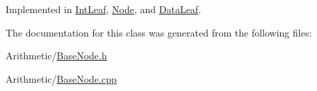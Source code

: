 Implemented in \hyperlink{class_int_leaf_a1817ac7916ab1c4ff09717db0a6d95f2}{Int\-Leaf}, \hyperlink{class_node_a858d4b4757880eba1fdead1412418693}{Node}, and \hyperlink{class_data_leaf_a62ce63296d298d6ffdc133dafe3b281f}{Data\-Leaf}.



The documentation for this class was generated from the following files\-:\begin{DoxyCompactItemize}
\item 
Arithmetic/\hyperlink{_base_node_8h}{Base\-Node.\-h}\item 
Arithmetic/\hyperlink{_base_node_8cpp}{Base\-Node.\-cpp}\end{DoxyCompactItemize}
